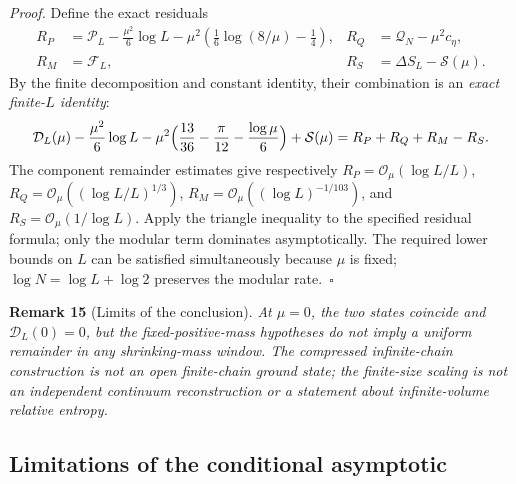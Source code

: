 \documentclass[
  10pt,
  a4paper,
]{article}
\begin{document}
\emph{Proof.} Define the exact residuals \[\begin{aligned}
R_P&=\mathcal P_L-\frac{\mu^2}{6}\log L-\mu^2(\tfrac16\log(8/\mu)-\tfrac14),&
R_Q&=\mathcal Q_N-\mu^2c_\eta,\\
R_M&=\mathcal F_L,&R_S&=\Delta S_L-\mathcal S(\mu).
\end{aligned}\] By the finite decomposition and constant identity, their combination is an \emph{exact finite-\(L\) identity}: \begin{equation}
\label{eq:residual}
\mathcal D_L(\mu)-\frac{\mu^2}{6}\log L
-\mu^2\Bigl(\frac{13}{36}-\frac\pi{12}-\frac{\log\mu}{6}\Bigr)+\mathcal S(\mu)=R_P+R_Q+R_M-R_S.
\end{equation} The component remainder estimates give respectively \(R_P=\mathcal O_\mu(\log L/L)\), \(R_Q=\mathcal O_\mu((\log L/L)^{1/3})\), \(R_M=\mathcal O_\mu((\log L)^{-1/103})\), and \(R_S=\mathcal O_\mu(1/\log L)\). Apply the triangle inequality to the specified residual formula; only the modular term dominates asymptotically. The required lower bounds on \(L\) can be satisfied simultaneously because \(\mu\) is fixed; \(\log N=\log L+\log2\) preserves the modular rate.~\(\square\)

\textbf{Remark 15} (Limits of the conclusion). \emph{At \(\mu=0\), the two states coincide and \(\mathcal D_L(0)=0\), but the fixed-positive-mass hypotheses do not imply a uniform remainder in any shrinking-mass window. The compressed infinite-chain construction is not an open finite-chain ground state; the finite-size scaling is not an independent continuum reconstruction or a statement about infinite-volume relative entropy.}

\subsection{Limitations of the conditional asymptotic}\label{limitations-of-the-conditional-asymptotic}
\end{document}
